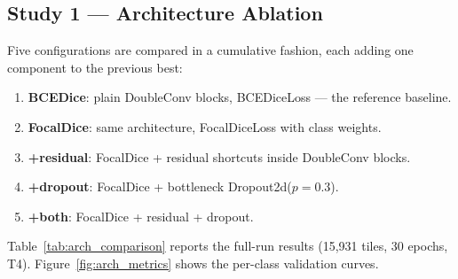 \documentclass{aa}
\begin{document}
\subsection{Study 1 --- Architecture Ablation}
\label{sec:mr_arch_ablation}

Five configurations are compared in a cumulative fashion, each adding one component to the previous best:

\begin{enumerate}
    \item \textbf{BCEDice}: plain DoubleConv blocks, BCEDiceLoss --- the reference baseline.
    \item \textbf{FocalDice}: same architecture, FocalDiceLoss with class weights.
    \item \textbf{+residual}: FocalDice + residual shortcuts inside DoubleConv blocks.
    \item \textbf{+dropout}: FocalDice + bottleneck Dropout2d($p=0.3$).
    \item \textbf{+both}: FocalDice + residual + dropout.
\end{enumerate}

Table~\ref{tab:arch_comparison} reports the full-run results (15{,}931 tiles, 30 epochs, T4).
Figure~\ref{fig:arch_metrics} shows the per-class validation curves.

\begin{table}[htbp]
\centering
\caption{Architecture ablation on the full dataset (Tesla T4, 30 epochs). Metrics are macro-averaged across the seven classes. Crater AP and Ridge AP are single-class AP values for \texttt{impact\_crater} and \texttt{wrinkle\_ridge}, which span the performance range.}
\label{tab:arch_comparison}
\end{table}
\end{document}
